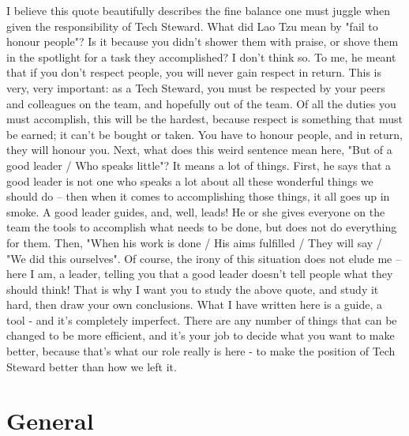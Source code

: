 \documentclass[letterpaper,10pt,oneside,headsepline]{scrreprt}
\begin{document}
I believe this quote beautifully describes the fine balance one must juggle when given the responsibility of Tech Steward. What did Lao Tzu mean by "fail to honour people"? Is it because you didn't shower them with praise, or shove them in the spotlight for a task they accomplished? I don't think so. To me, he meant that if you don't respect people, you will never gain respect in return. This is very, very important: as a Tech Steward, you must be respected by your peers and colleagues on the team, and hopefully out of the team. Of all the duties you must accomplish, this will be the hardest, because respect is something that must be earned; it can't be bought or taken. You have to honour people, and in return, they will honour you. Next, what does this weird sentence mean here, "But of a good leader / Who speaks little"? It means a lot of things. First, he says that a good leader is not one who speaks a lot about all these wonderful things we should do -- then when it comes to accomplishing those things, it all goes up in smoke. A good leader guides, and, well, leads! He or she gives everyone on the team the tools to accomplish what needs to be done, but does not do everything for them. Then, "When his work is done / His aims fulfilled / They will say / "We did this ourselves". Of course, the irony of this situation does not elude me -- here I am, a leader, telling you that a good leader doesn't tell people what they should think! That is why I want you to study the above quote, and study it hard, then draw your own conclusions. What I have written here is a guide, a tool - and it's completely imperfect. There are any number of things that can be changed to be more efficient, and it's your job to decide what you want to make better, because that's what our role really is here - to make the position of Tech Steward better than how we left it.

\chapter{General}

\end{document}
